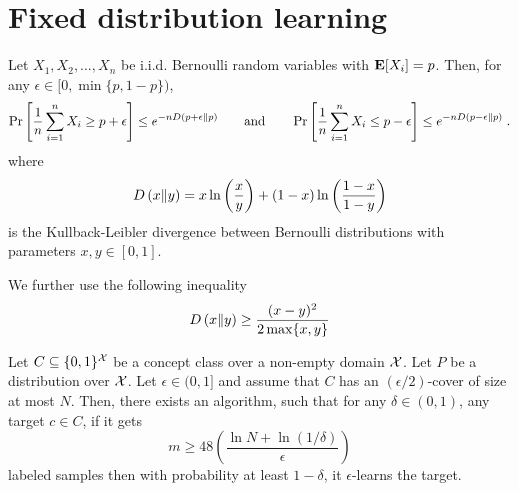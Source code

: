 \section{Fixed distribution learning}
\label{section:fixed-distribution-learning}

\begin{theorem}
Let $X_1, X_2, \dots, X_n$ be i.i.d. Bernoulli random variables with $\operatorname{\mathbf{E}}[X_i] = p$.
Then, for any $\epsilon \in [0, \min\{p,1-p\})$,
$$
\Pr \left[{\frac {1}{n}} \sum_{i=1}^n X_i \ge p + \epsilon \right] \le e^{ - n D\left(p + \epsilon \middle\| p \right)}  \qquad \text{and} \qquad
\Pr \left[{\frac {1}{n}} \sum_{i=1}^n X_i \le p - \epsilon \right] \le e^{ - n D\left(p - \epsilon \middle\| p \right)}  \; . \\
$$
where
$$
D\left(x \middle\| y \right) = x \ln \left( \frac{x}{y} \right) + (1 - x) \ln \left( \frac{1-x}{1-y} \right)
$$
is the Kullback-Leibler divergence between Bernoulli distributions with parameters $x, y \in [0,1]$.
\end{theorem}

We further use the following inequality
$$
D\left(x \middle\| y \right) \ge \frac{(x-y)^2}{2 \max\{x, y\}}
$$


\begin{theorem}
Let $C \subseteq \{0,1\}^{\mathcal{X}}$ be a concept class over a non-empty domain $\mathcal{X}$.
Let $P$ be a distribution over $\mathcal{X}$. Let $\epsilon \in (0,1]$ and assume that
$C$ has an $(\epsilon/2)$-cover of size at most $N$. Then, there exists an algorithm, such
that for any $\delta \in (0,1)$, any target $c \in C$, if it gets
$$
m \ge 48\left(\frac{\ln N + \ln(1/\delta)}{\epsilon}\right)
$$
labeled samples then with probability at least $1 - \delta$, it
$\epsilon$-learns the target.
\end{theorem}

